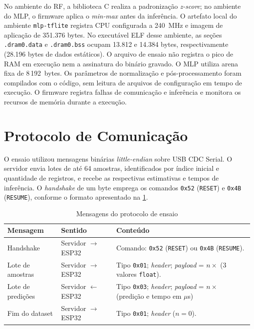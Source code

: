 No ambiente do RF, a biblioteca C realiza a padronização \textit{z-score};
no ambiente do MLP, o firmware aplica o \textit{min-max} antes da
inferência. O artefato local do ambiente \texttt{mlp-tflite} registra CPU
configurada a 240~MHz e imagem de aplicação de 351.376 bytes. No executável
ELF desse ambiente, as seções \texttt{.dram0.data} e \texttt{.dram0.bss}
ocupam 13.812 e 14.384 bytes, respectivamente (28.196 bytes de dados
estáticos). O arquivo de ensaio não registra o pico de RAM em execução nem a
assinatura do binário gravado. O MLP utiliza arena fixa de 8\,192~bytes. Os
parâmetros de normalização e pós-processamento foram compilados com o
código, sem leitura de arquivos de configuração em tempo de execução. O
firmware registra falhas de comunicação e inferência e monitora os recursos
de memória durante a execução.

\section{Protocolo de Comunicação}

O ensaio utilizou mensagens binárias \textit{little-endian} sobre USB CDC
Serial. O servidor envia lotes de até 64 amostras, identificados por índice
inicial e quantidade de registros, e recebe as respectivas estimativas e
tempos de inferência. O \textit{handshake} de um byte emprega os comandos
\texttt{0x52} (\texttt{RESET}) e \texttt{0x4B} (\texttt{RESUME}), conforme o
formato apresentado na \cref{tab:protocolo}.

\begin{table}[htbp]
  \centering
  \caption{Mensagens do protocolo de ensaio}
  \label{tab:protocolo}
  \scriptsize
  \begin{tabular}{p{2.2cm}p{2.7cm}p{8cm}}
    \toprule
    Mensagem & Sentido & Conteúdo \\
    \midrule
    Handshake & Servidor $\rightarrow$ ESP32 & Comando: \texttt{0x52} (\texttt{RESET}) ou \texttt{0x4B} (\texttt{RESUME}). \\
    Lote de amostras & Servidor $\rightarrow$ ESP32 & Tipo \texttt{0x01}; \textit{header}; \textit{payload} = $n \times$ (3 valores \texttt{float}). \\
    Lote de predições & Servidor $\leftarrow$ ESP32 & Tipo \texttt{0x03}; \textit{header}; \textit{payload} = $n \times$ (predição e tempo em $\mu$s) \\
    Fim do dataset & Servidor $\rightarrow$ ESP32 & Tipo \texttt{0x01}; \textit{header} ($n=0$). \\
    \bottomrule
  \end{tabular}
\end{table}

